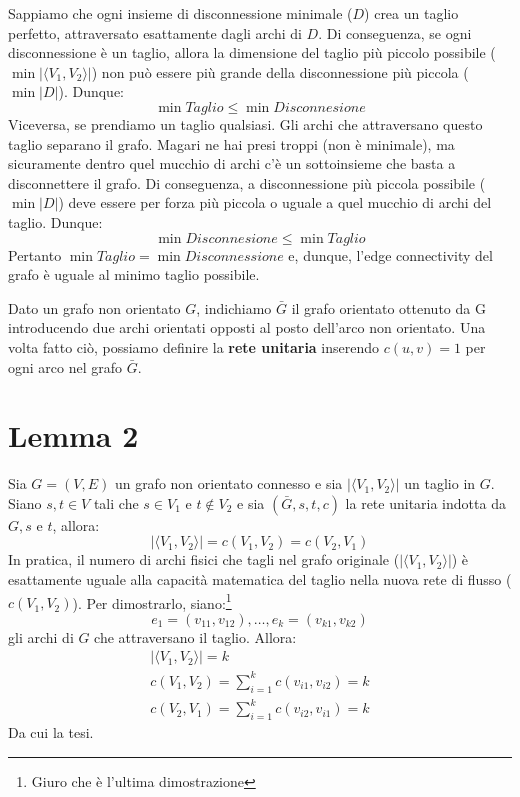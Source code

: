 Sappiamo che ogni insieme di disconnessione minimale ($D$) crea un taglio perfetto, attraversato esattamente dagli archi di $D$. Di conseguenza, se ogni disconnessione è un taglio, allora la dimensione del taglio più piccolo possibile ($\min |\langle V_1, V_2 \rangle|$) non può essere più grande della disconnessione più piccola ($\min |D|$). Dunque:
\[\min Taglio \leq \min Disconnesione\]
Viceversa, se prendiamo un taglio qualsiasi. Gli archi che attraversano questo taglio separano il grafo. Magari ne hai presi troppi (non è minimale), ma sicuramente dentro quel mucchio di archi c'è un sottoinsieme che basta a disconnettere il grafo. Di conseguenza, a disconnessione più piccola possibile ($\min |D|$) deve essere per forza più piccola o uguale a quel mucchio di archi del taglio. Dunque:
\[\min Disconnesione \leq \min Taglio\]
Pertanto $\min Taglio = \min Disconnessione$ e, dunque, l'edge connectivity del grafo è uguale al minimo taglio possibile.

Dato un grafo non orientato $G$, indichiamo $\bar{G}$ il grafo orientato ottenuto da G introducendo due archi orientati opposti al posto dell'arco non orientato. Una volta fatto ciò, possiamo definire la \textbf{rete unitaria} inserendo $c(u, v)= 1$ per ogni arco nel grafo $\bar{G}$. 
\section*{Lemma 2}
Sia $G=(V,E)$ un grafo non orientato connesso e sia $|\langle V_1, V_2 \rangle|$ un taglio in $G$. Siano $s,t \in V$ tali che $s \in V_1$ e $t \notin V_2$ e sia $(\bar{G}, s, t, c)$ la rete unitaria indotta da $G, s$ e $t$, allora:
\[|\langle V_1, V_2 \rangle| = c(V_1,V_2) = c(V_2,V_1)\]
In pratica, il numero di archi fisici che tagli nel grafo originale ($|\langle V_1, V_2 \rangle|$) è esattamente uguale alla capacità matematica del taglio nella nuova rete di flusso ($c(V_1, V_2)$).
Per dimostrarlo, siano:\footnote{Giuro che è l'ultima dimostrazione}
\[e_1 = (v_{11}, v_{12}), \dots, e_k = (v_{k1}, v_{k2})\]
gli archi di $G$ che attraversano il taglio. Allora:
\begin{align*}
    |\langle V_1, V_2 \rangle| = k \\
    c(V_1, V_2) = \sum_{i=1}^{k} c(v_{i1},v_{i2}) = k\\
    c(V_2, V_1) = \sum_{i=1}^{k} c(v_{i2},v_{i1}) = k
\end{align*}
Da cui la tesi.
